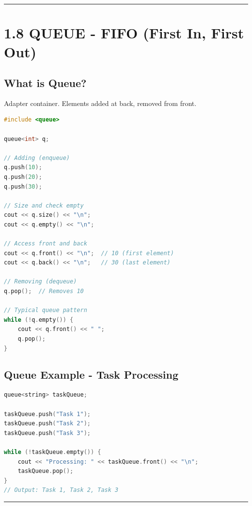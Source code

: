\begin{center}\rule{0.5\linewidth}{0.5pt}\end{center}

\hypertarget{queue---fifo-first-in-first-out}{%
\section{1.8 QUEUE - FIFO (First In, First
Out)}\label{queue---fifo-first-in-first-out}}

\hypertarget{what-is-queue}{%
\subsection{What is Queue?}\label{what-is-queue}}

Adapter container. Elements added at back, removed from front.

\begin{lstlisting}[language={C++}]
#include <queue>

queue<int> q;

// Adding (enqueue)
q.push(10);
q.push(20);
q.push(30);

// Size and check empty
cout << q.size() << "\n";
cout << q.empty() << "\n";

// Access front and back
cout << q.front() << "\n";  // 10 (first element)
cout << q.back() << "\n";   // 30 (last element)

// Removing (dequeue)
q.pop();  // Removes 10

// Typical queue pattern
while (!q.empty()) {
    cout << q.front() << " ";
    q.pop();
}
\end{lstlisting}

\hypertarget{queue-example---task-processing}{%
\subsection{Queue Example - Task
Processing}\label{queue-example---task-processing}}

\begin{lstlisting}[language={C++}]
queue<string> taskQueue;

taskQueue.push("Task 1");
taskQueue.push("Task 2");
taskQueue.push("Task 3");

while (!taskQueue.empty()) {
    cout << "Processing: " << taskQueue.front() << "\n";
    taskQueue.pop();
}
// Output: Task 1, Task 2, Task 3
\end{lstlisting}

\begin{center}\rule{0.5\linewidth}{0.5pt}\end{center}

